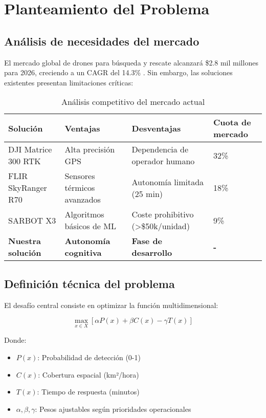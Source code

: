 \documentclass[journal]{new-aiaa}
\begin{document}
\section{Planteamiento del Problema}
\subsection{Análisis de necesidades del mercado}
El mercado global de drones para búsqueda y rescate alcanzará \$2.8 mil millones para 2026, creciendo a un CAGR del 14.3\% \cite{MarketsandMarkets2024}. Sin embargo, las soluciones existentes presentan limitaciones críticas:

\begin{table}[h]
\centering
\caption{Análisis competitivo del mercado actual}

\begin{tabularx}{\textwidth}{|l|X|X|X|}
\hline
\textbf{Solución} & \textbf{Ventajas} & \textbf{Desventajas} & \textbf{Cuota de mercado} \\
\hline
DJI Matrice 300 RTK & Alta precisión GPS & Dependencia de operador humano & 32\% \\
\hline
FLIR SkyRanger R70 & Sensores térmicos avanzados & Autonomía limitada (25 min) & 18\% \\
\hline
SARBOT X3 & Algoritmos básicos de ML & Coste prohibitivo (>\$50k/unidad) & 9\% \\
\hline
\textbf{Nuestra solución} & \textbf{Autonomía cognitiva} & \textbf{Fase de desarrollo} & \textbf{-} \\
\hline
\end{tabularx}
\end{table}

\subsection{Definición técnica del problema}
El desafío central consiste en optimizar la función multidimensional:

\begin{equation}
\max_{x \in X} \left[ \alpha P(x) + \beta C(x) - \gamma T(x) \right]
\end{equation}

Donde:
\begin{itemize}
\item $P(x)$: Probabilidad de detección (0-1)
\item $C(x)$: Cobertura espacial (km²/hora)
\item $T(x)$: Tiempo de respuesta (minutos)
\item $\alpha, \beta, \gamma$: Pesos ajustables según prioridades operacionales
\end{itemize}
\end{document}
